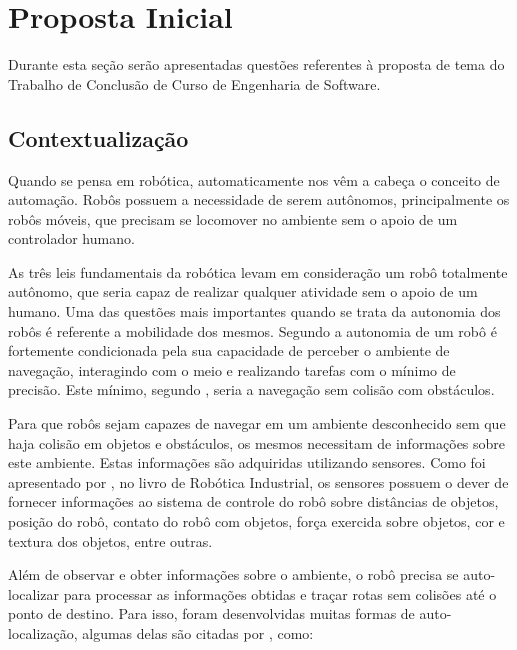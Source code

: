 
\chapter[Proposta Inicial]{Proposta Inicial}
	
	Durante esta seção serão apresentadas questões referentes à proposta de tema do Trabalho de Conclusão de Curso de Engenharia de Software.

\section{Contextualização}

	Quando se pensa em robótica, automaticamente nos vêm a cabeça o conceito de automação. Robôs possuem a necessidade de serem autônomos, principalmente os robôs móveis, que precisam se locomover no ambiente sem o apoio de um controlador humano.

	As três leis fundamentais da robótica levam em consideração um robô totalmente autônomo, que seria capaz de realizar qualquer atividade sem o apoio de um humano. Uma das questões mais importantes quando se trata da autonomia dos robôs é referente a mobilidade dos mesmos. Segundo \cite{localizacaoEMapeamentoPaulo} a autonomia de um robô é fortemente condicionada pela sua capacidade de perceber o ambiente de navegação, interagindo com o meio e realizando tarefas com o mínimo de precisão. Este mínimo, segundo \cite{localizacaoEMapeamentoPaulo}, seria a navegação sem colisão com obstáculos. 

	Para que robôs sejam capazes de navegar em um ambiente desconhecido sem que haja colisão em objetos e obstáculos, os mesmos necessitam de informações sobre este ambiente. Estas informações são adquiridas utilizando sensores. Como foi apresentado por \cite{interacaoRoboAmbiente}, no livro de Robótica Industrial, os sensores possuem o dever de fornecer informações ao sistema de controle do robô sobre distâncias de objetos, posição do robô, contato do robô com objetos, força exercida sobre objetos, cor e textura dos objetos, entre outras.

	Além de observar e obter informações sobre o ambiente, o robô precisa se auto-localizar para processar as informações obtidas e traçar rotas sem colisões até o ponto de destino. Para isso, foram desenvolvidas muitas formas de auto-localização, algumas delas são citadas por \cite{roboBulldozerIV}, como:

